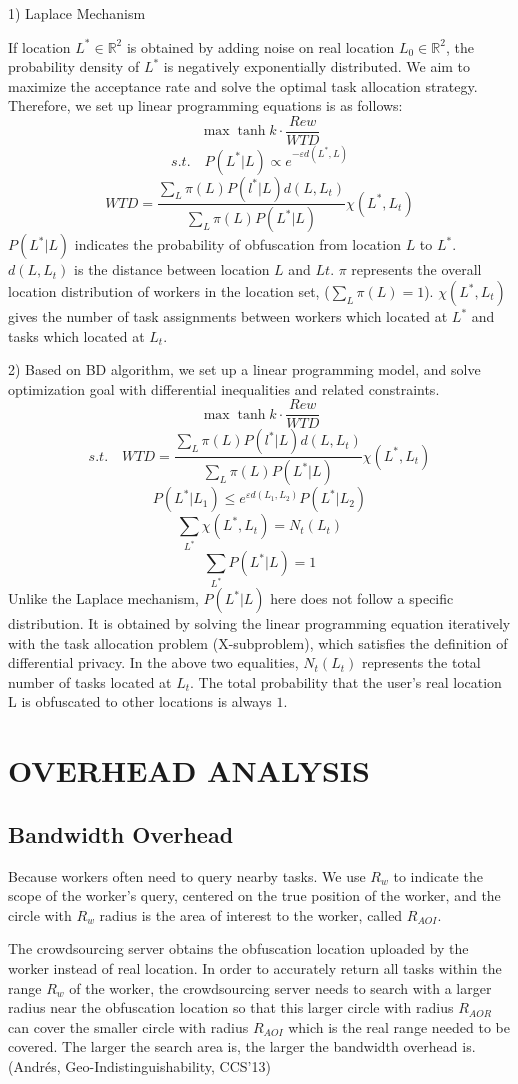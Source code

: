 1) Laplace Mechanism

If location $L^* \in \mathbb R^2$ is obtained by adding noise on real location $L_0 \in \mathbb R^2$, the probability density of $L^*$ is negatively exponentially distributed. We aim to maximize the acceptance rate and solve the optimal task allocation strategy. Therefore, we set up linear programming equations is as follows:
$$
	\max \tanh {k \cdot \frac{Rew}{WTD}}
$$
$$
	s.t. \quad P(L^*|L) \propto e^{-\varepsilon d(L^*,L)}
$$
$$
	WTD=\frac {\sum_L \pi(L) P(l^*|L) d(L,L_t)} {\sum_L \pi(L) P(L^*|L)} \chi(L^*,L_t)
$$
$P(L^*|L)$ indicates the probability of obfuscation from location $L$ to $L^*$. $d(L,L_t)$ is the distance between location $L$ and $Lt$. $\pi$ represents the overall location distribution of workers in the location set, ($\sum_L \pi(L)=1$). $\chi(L^*,L_t)$ gives the number of task assignments between workers which located at $L^*$ and tasks which located at $L_t$. 

2) Based on BD algorithm, we set up a linear programming model, and solve optimization goal with differential inequalities and related constraints.
$$
	\max \tanh {k \cdot \frac{Rew}{WTD}}
$$
$$
	s.t. \quad WTD=\frac {\sum_L \pi(L) P(l^*|L) d(L,L_t)} {\sum_L \pi(L) P(L^*|L)} \chi(L^*,L_t)
$$
$$
	P(L^*|L_1) \leq e^{\varepsilon d(L_1,L_2)} P(L^*|L_2) 
$$
$$
	\sum_{L^*} \chi(L^*,L_t)=N_t (L_t)
$$
$$
	\sum_{L^*} P(L^*|L)=1
$$
Unlike the Laplace mechanism, $P(L^*|L)$ here does not follow a specific distribution. It is obtained by solving the linear programming equation iteratively with the task allocation problem (X-subproblem), which satisfies the definition of differential privacy. In the above two equalities, $N_t (L_t)$ represents the total number of tasks located at $L_t$. The total probability that the user’s real location L is obfuscated to other locations is always $1$.

\section{OVERHEAD ANALYSIS}
\subsection{Bandwidth Overhead}
Because workers often need to query nearby tasks. We use $R_w$ to indicate the scope of the worker's query, centered on the true position of the worker, and the circle with $R_w$ radius is the area of interest to the worker, called $R_{AOI}$.

The crowdsourcing server obtains the obfuscation location uploaded by the worker instead of real location. In order to accurately return all tasks within the range $R_w$ of the worker, the crowdsourcing server needs to search with a larger radius near the obfuscation location so that this larger circle with radius $R_{AOR}$ can cover the smaller circle with radius $R_{AOI}$ which is the real range needed to be covered. The larger the search area is, the larger the bandwidth overhead is. (Andrés, Geo-Indistinguishability, CCS’13)

